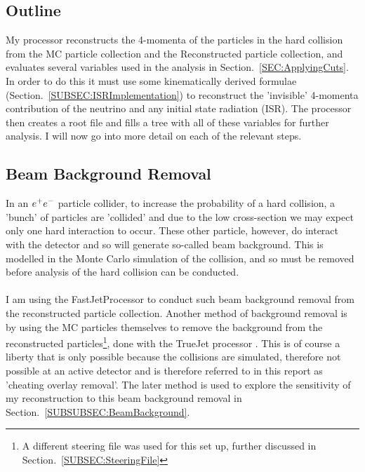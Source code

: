 \subsection{Outline}
\label{SUBSEC:Outline}
My processor reconstructs the 4-momenta of the particles in the hard collision from the MC particle collection and the Reconstructed particle collection, and evaluates several variables used in the analysis in Section.~\ref{SEC:ApplyingCuts}. In order to do this it must use some kinematically derived formulae (Section.~\ref{SUBSEC:ISRImplementation}) to reconstruct the 'invisible’ 4-momenta contribution of the neutrino and any initial state radiation (ISR). The processor then creates a root file and fills a tree with all of these variables for further analysis. I will now go into more detail on each of the relevant steps.

\subsection{Beam Background Removal}
\label{SUBSEC:BeamBackgroundRemoval}
In an $e^{+}e^{-}$ particle collider, to increase the probability of a hard collision, a 'bunch' \cite{bunch} of particles are 'collided’ and due to the low cross-section we may expect only one hard interaction to occur. These other particle, however, do interact with the detector and so will generate so-called beam background. This is modelled in the Monte Carlo simulation of the collision, and so must be removed before analysis of the hard collision can be conducted.
\\\\
I am using the FastJetProcessor \cite{FastJet} to conduct such beam background removal from the reconstructed particle collection. Another method of background removal is by using the MC particles themselves to remove the background from the reconstructed particles\footnote{A different steering file was used for this set up, further discussed in Section.~\ref{SUBSEC:SteeringFile}}, done with the TrueJet processor \cite{TrueJet}. This is of course a liberty that is only possible because the collisions are simulated, therefore not possible at an active detector and is therefore referred to in this report as 'cheating overlay removal'. The later method is used to explore the sensitivity of my reconstruction to this beam background removal in Section.~\ref{SUBSUBSEC:BeamBackground}.

